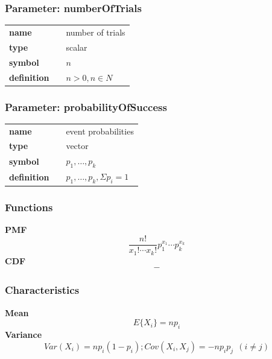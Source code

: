 
\subsubsection*{Parameter: numberOfTrials}

\noindent\begin{tabular}{p{2cm}cl}
\textbf{name} & & number of trials \\
\textbf{type} & & scalar \\
\textbf{symbol} & & $n$  \\
\textbf{definition} & & $n > 0, n \in N$
\end{tabular}
\subsubsection*{Parameter: probabilityOfSuccess}

\noindent\begin{tabular}{p{2cm}cl}
\textbf{name} & & event probabilities \\
\textbf{type} & & vector \\
\textbf{symbol} & & $p_1, \ldots, p_k$  \\
\textbf{definition} & & $p_1, \ldots, p_k, \Sigma p_i = 1$
\end{tabular}
\subsubsection*{Functions}

\smallskip \noindent \hspace{.2cm} \textbf{PMF} 
\begin{equation*}\frac{n!}{x_1!\cdots x_k!} p_1^{x_1} \cdots p_k^{x_k}\end{equation*}
\smallskip \noindent \hspace{.2cm} \textbf{CDF} 
\begin{equation*}-\end{equation*}
\smallskip
\subsubsection*{Characteristics}
\smallskip \noindent \hspace{.2cm} \textbf{Mean} 
\begin{equation*}E\{X_i\} = np_i\end{equation*}
\smallskip \noindent \hspace{.2cm} \textbf{Variance} 
\begin{equation*}Var(X_i) = n p_i (1-p_i); 
Cov(X_i,X_j) = - n p_i p_j~~(i\neq j)\end{equation*}
\smallskip
